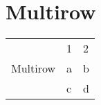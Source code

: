 \documentclass[10pt, a4paper]{article}
\begin{document}
\section{Multirow}

\begin{tabular}{lll}
\hline
\multirow{3}{*}{Multirow} & 1 & 2 \\
 & a & b \\
 & c & d \\
\hline
\end{tabular}
\end{document}
